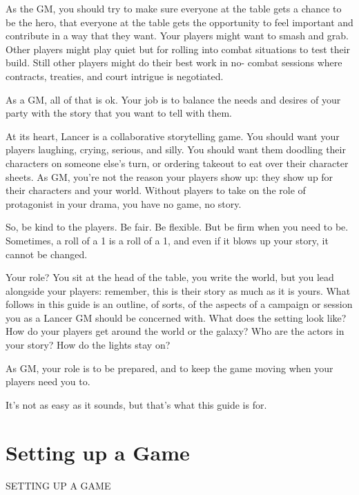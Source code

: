 As the GM, you should try to make sure everyone at the table gets a chance to be the hero,  
that everyone at the table gets the opportunity to feel important and contribute in a way that they  
want. Your players might want to smash and grab. Other players might play quiet but for rolling  
into combat situations to test their build. Still other players might do their best work in no- 
combat sessions where contracts, treaties, and court intrigue is negotiated. 
 

As a GM, all of that is ok. Your job is to balance the needs and desires of your party with the  
story that you want to tell with them. 
 

At its heart, Lancer is a collaborative storytelling game. You should want your players  
laughing, crying, serious, and silly. You should want them doodling their characters on someone  
else’s turn, or ordering takeout to eat over their character sheets. As GM, you’re not the reason  
your players show up: they show up for their characters and your world. Without players to take  
on the role of protagonist in your drama, you have no game, no story. 
 

So, be kind to the players. Be fair. Be flexible. But be firm when you need to be. Sometimes, a  
roll of a 1 is a roll of a 1, and even if it blows up your story, it cannot be changed. 
 

                                                                                                          


Your role? You sit at the head of the table, you write the world, but you lead alongside your  
players: remember, this is their story as much as it is yours. What follows in this guide is an  
outline, of sorts, of the aspects of a campaign or session you as a Lancer GM should be  
concerned with. What does the setting look like? How do your players get around the world or  
the galaxy? Who are the actors in your story? How do the lights stay on? 
 

As GM, your role is to be prepared, and to keep the game moving when your players need you  
to. 
 

It’s not as easy as it sounds, but that’s what this guide is for. 

\chapter{Setting up a Game}


                            SETTING UP A GAME  


